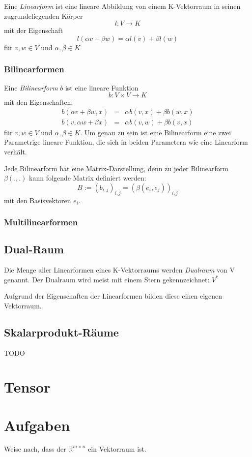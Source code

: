 \begin{definition}
Eine \textsl{Linearform}  ist eine lineare Abbildung von einem K-Vektorraum in seinen zugrundeliegenden Körper
\[
l : V \longrightarrow K
\]
mit der Eigenschaft
\[l(\alpha v + \beta w) = \alpha l(v) + \beta l(w) \]
für $v,w\in V$ und $\alpha, \beta \in K$
\end{definition}

\subsubsection{Bilinearformen}

\begin{definition}
Eine \textsl{Bilinearform} $b$ ist eine lineare Funktion
\[
	b : V \times V \longrightarrow K
\]
mit den Eigenschaften:
\begin{eqnarray*}
b(\alpha v + \beta w,x) &=& \alpha b(v,x) + \beta b(w,x) \\
b(v,\alpha w + \beta x) &=& \alpha b(v,w) + \beta b(v,x) 
\end{eqnarray*}
für $v,w\in V$ und $\alpha, \beta \in K$. Um genau zu sein ist eine Bilinearform eine zwei Parametrige lineare Funktion, die sich in beiden Parametern wie eine Linearform verhält.

Jede Bilinearform hat eine Matrix-Darstellung, denn zu jeder Bilinearform $\beta(.,.)$ kann folgende Matrix definiert werden:
\[
B := (b_{i,j})_{i,j} = (\beta(e_i, e_j))_{i,j}
\]
mit den Basisvektoren $e_i$.

\subsubsection{Multilinearformen}



\end{definition}

\subsection{Dual-Raum}

\begin{definition}
Die Menge aller Linearformen eines K-Vektorraums werden \textsl{Dualraum} von V genannt. Der Dualraum wird meist mit einem Stern gekennzeichnet: $V^*$
\end{definition}

Aufgrund der Eigenschaften der Linearformen bilden diese einen eigenen Vektorraum. 

\subsection{Skalarprodukt-Räume}

TODO


\section{Tensor}



\section{Aufgaben}

\begin{prob}
\label{matrix.1}

Weise nach, dass der $\mathbb{R}^{m\times n}$ ein Vektorraum ist. 

\end{prob}


